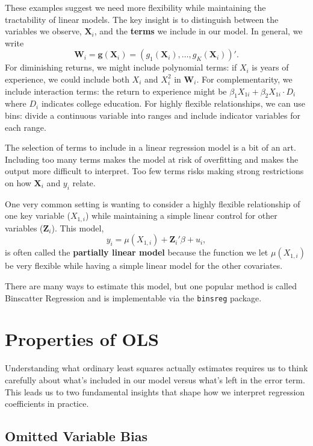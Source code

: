 \documentclass[12pt]{article}
\begin{document}
\begin{multicols}{2}
These examples suggest we need more flexibility while maintaining the tractability of linear models.
The key insight is to distinguish between the variables we observe, $\bm{X}_i$, and the \textbf{terms} we include in our model. 
In general, we write
$$
  \bm{W}_i = \bm{g}(\bm{X}_i) = \left( g_1(\bm{X}_i), \dots, g_K(\bm{X}_i) \right)'.
$$
For diminishing returns, we might include polynomial terms: if $X_i$ is years of experience, we could include both $X_i$ and $X_i^2$ in $\bm{W}_i$.
For complementarity, we include interaction terms: the return to experience might be $\beta_1 X_{1i} + \beta_2 X_{1i} \cdot D_i$ where $D_i$ indicates college education.
For highly flexible relationships, we can use bins: divide a continuous variable into ranges and include indicator variables for each range.

The selection of terms to include in a linear regression model is a bit of an art. 
Including too many terms makes the model at risk of overfitting and makes the output more difficult to interpret.
Too few terms risks making strong restrictions on how $\bm{X}_i$ and $y_i$ relate.

One very common setting is wanting to consider a highly flexible relationship of one key variable ($X_{1,i}$) while maintaining a simple linear control for other variables ($\bm{Z}_i$).
This model,
$$
  y_i = \mu(X_{1,i}) + \bm{Z}_i' \beta + u_i,
$$
is often called the \textbf{partially linear model} because the function we let $\mu(X_{1,i})$ be very flexible while having a simple linear model for the other covariates.

There are many ways to estimate this model, but one popular method is called Binscatter Regression and is implementable via the \texttt{binsreg} package.

\section*{Properties of OLS}

Understanding what ordinary least squares actually estimates requires us to think carefully about what's included in our model versus what's left in the error term.
This leads us to two fundamental insights that shape how we interpret regression coefficients in practice.

\subsection*{Omitted Variable Bias}


\end{multicols}
\end{document}
